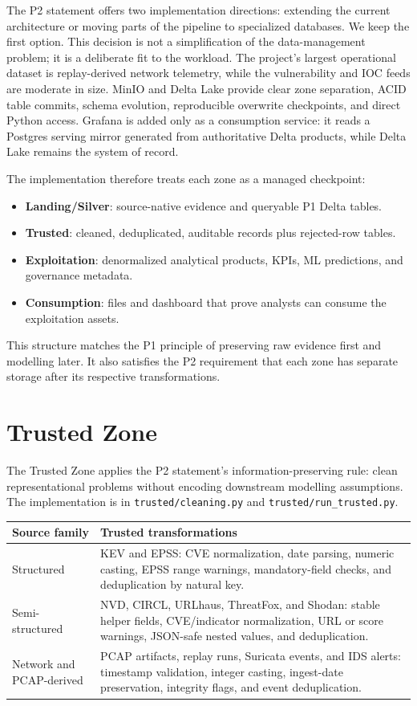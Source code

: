 \documentclass[11pt,a4paper]{article}
\newcommand{\code}[1]{\nolinkurl{#1}}
\newcommand{\hdr}{\rowcolor{csiHead}}
\begin{document}
The P2 statement offers two implementation directions: extending the current architecture or moving parts of the pipeline to specialized databases. We keep the first option. This decision is not a simplification of the data-management problem; it is a deliberate fit to the workload. The project's largest operational dataset is replay-derived network telemetry, while the vulnerability and IOC feeds are moderate in size. MinIO and Delta Lake provide clear zone separation, ACID table commits, schema evolution, reproducible overwrite checkpoints, and direct Python access. Grafana is added only as a consumption service: it reads a Postgres serving mirror generated from authoritative Delta products, while Delta Lake remains the system of record.

The implementation therefore treats each zone as a managed checkpoint:
\begin{itemize}
  \item \textbf{Landing/Silver}: source-native evidence and queryable P1 Delta tables.
  \item \textbf{Trusted}: cleaned, deduplicated, auditable records plus rejected-row tables.
  \item \textbf{Exploitation}: denormalized analytical products, KPIs, ML predictions, and governance metadata.
  \item \textbf{Consumption}: files and dashboard that prove analysts can consume the exploitation assets.
\end{itemize}

This structure matches the P1 principle of preserving raw evidence first and modelling later. It also satisfies the P2 requirement that each zone has separate storage after its respective transformations.

\section{Trusted Zone}

The Trusted Zone applies the P2 statement's information-preserving rule: clean representational problems without encoding downstream modelling assumptions. The implementation is in \code{trusted/cleaning.py} and \code{trusted/run_trusted.py}.

\begin{tabularx}{\textwidth}{>{\raggedright\arraybackslash}p{2.8cm}X}
\toprule
\hdr
\textbf{Source family} & \textbf{Trusted transformations}\\
\midrule
Structured & KEV and EPSS: CVE normalization, date parsing, numeric casting, EPSS range warnings, mandatory-field checks, and deduplication by natural key.\\
Semi-structured & NVD, CIRCL, URLhaus, ThreatFox, and Shodan: stable helper fields, CVE/indicator normalization, URL or score warnings, JSON-safe nested values, and deduplication.\\
Network and PCAP-derived & PCAP artifacts, replay runs, Suricata events, and IDS alerts: timestamp validation, integer casting, ingest-date preservation, integrity flags, and event deduplication.\\
\bottomrule
\end{tabularx}
\end{document}
